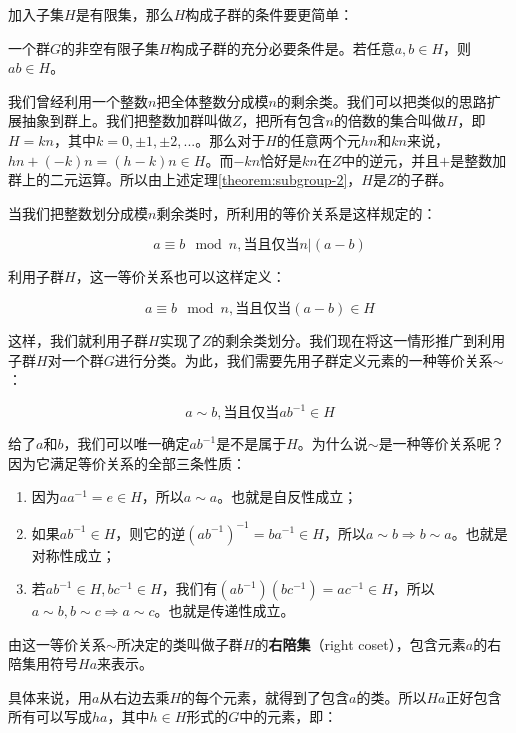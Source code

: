 \documentclass{article}
\begin{document}
加入子集$H$是有限集，那么$H$构成子群的条件要更简单：

\begin{theorem}
一个群$G$的非空有限子集$H$构成子群的充分必要条件是。若任意$a, b \in H$，则$ab \in H$。
\end{theorem}

我们曾经利用一个整数$n$把全体整数分成模$n$的剩余类。我们可以把类似的思路扩展抽象到群上。我们把整数加群叫做$Z$，把所有包含$n$的倍数的集合叫做$H$，即$H = {kn}$，其中$k = 0, \pm 1, \pm 2, ...$。那么对于$H$的任意两个元$hn$和$kn$来说，$hn + (-k)n = (h - k)n \in H$。而$-kn$恰好是$kn$在$Z$中的逆元，并且$+$是整数加群上的二元运算。所以由上述定理\ref{theorem:subgroup-2}，$H$是$Z$的子群。

当我们把整数划分成模$n$剩余类时，所利用的等价关系是这样规定的：

\[
a \equiv b \mod n, \text{当且仅当} n | (a - b)
\]

利用子群$H$，这一等价关系也可以这样定义：

\[
a \equiv b \mod n, \text{当且仅当} (a - b) \in H
\]

这样，我们就利用子群$H$实现了$Z$的剩余类划分。我们现在将这一情形推广到利用子群$H$对一个群$G$进行分类。为此，我们需要先用子群定义元素的一种等价关系$\sim$：

\[
a \sim b, \text{当且仅当} ab^{-1} \in H
\]

给了$a$和$b$，我们可以唯一确定$ab^{-1}$是不是属于$H$。为什么说$\sim$是一种等价关系呢？因为它满足等价关系的全部三条性质：

\begin{enumerate}
\item 因为$aa^{-1} = e \in H$，所以$a \sim a$。也就是自反性成立；
\item 如果$ab^{-1} \in H$，则它的逆$(ab^{-1})^{-1}= ba^{-1} \in H$，所以$a \sim b \Rightarrow b \sim a$。也就是对称性成立；
\item 若$ab^{-1} \in H, bc^{-1} \in H$，我们有$(ab^{-1})(bc^{-1}) = ac^{-1} \in H$，所以$a \sim b, b \sim c \Rightarrow a \sim c$。也就是传递性成立。
\end{enumerate}

\begin{definition}
由这一等价关系$\sim$所决定的类叫做子群$H$的\textbf{右陪集}（right coset），包含元素$a$的右陪集用符号$Ha$来表示。
\end{definition}

具体来说，用$a$从右边去乘$H$的每个元素，就得到了包含$a$的类。所以$Ha$正好包含所有可以写成$ha$，其中$h \in H$形式的$G$中的元素，即：
\end{document}

